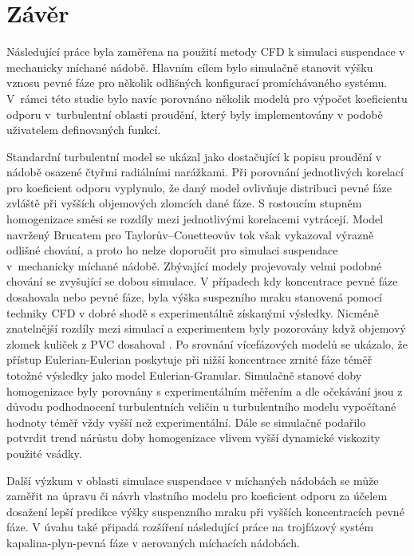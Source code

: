 \chapter{Závěr}
Následující práce byla zaměřena na použití metody CFD k simulaci suspendace v mechanicky míchané nádobě. Hlavním cílem bylo simulačně stanovit výšku vznosu pevné fáze pro několik odlišných konfigurací promíchávaného systému. V~rámci této studie bylo navíc porovnáno několik modelů pro výpočet koeficientu odporu v~turbulentní oblasti proudění, který byly implementovány v podobě uživatelem definovaných funkcí.

Standardní \keps{} turbulentní model se ukázal jako dostačující k popisu proudění v nádobě osazené čtyřmi radiálními narážkami. Při porovnání jednotlivých korelací pro koeficient odporu vyplynulo, že daný model ovlivňuje distribuci pevné fáze zvláště při vyšších objemových zlomcích dané fáze. S rostoucím stupněm homogenizace směsi se rozdíly mezi jednotlivými korelacemi vytrácejí. Model navržený Brucatem pro Taylorův–Couetteovův tok však vykazoval výrazně odlišné chování, a proto ho nelze doporučit pro simulaci suspendace v~mechanicky míchané nádobě. Zbývající modely projevovaly velmi podobné chování se zvyšující se dobou simulace. V případech kdy koncentrace pevné fáze dosahovala  nebo  pevné fáze, byla výška suspezního mraku stanovená pomocí techniky CFD v dobré shodě s experimentálně získanými výsledky. Nicméně znatelnější rozdíly mezi simulací a experimentem byly pozorovány když objemový zlomek kuliček z PVC dosahoval . Po srovnání vícefázových modelů se ukázalo, že přístup Eulerian-Eulerian poskytuje při nižší koncentrace zrnité fáze téměř totožné výsledky jako model Eulerian-Granular. Simulačně stanové doby homogenizace byly porovnány s experimentálním měřením a dle očekávání jsou z důvodu podhodnocení turbulentních veličin u \keps{} turbulentního modelu vypočítané hodnoty téměř vždy vyšší než experimentální. Dále se simulačně podařilo potvrdit trend nárůstu doby homogenizace vlivem vyšší dynamické viskozity použité vsádky.

Další výzkum v oblasti simulace suspendace v míchaných nádobách se může zaměřit na úpravu či návrh vlastního modelu pro koeficient odporu za účelem dosažení lepší predikce výšky suspenzního mraku při vyšších koncentracích pevné fáze. V úvahu také připadá rozšíření následující práce na trojfázový systém kapalina-plyn-pevná fáze v ae\-ro\-va\-ných mí\-cha\-cích ná\-do\-bách.
